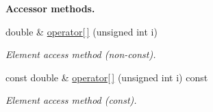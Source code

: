 \begin{Indent}{\bf Accessor methods.}\par
\begin{DoxyCompactItemize}
\item 
double \& \hyperlink{class_q_u_e_s_o_1_1_gsl_vector_a5fa9fb9a84749ea69919e6bc4a5ee9f9}{operator\mbox{[}$\,$\mbox{]}} (unsigned int i)
\begin{DoxyCompactList}\small\item\em Element access method (non-\/const). \end{DoxyCompactList}\item 
const double \& \hyperlink{class_q_u_e_s_o_1_1_gsl_vector_a10150c873dc75f642bda5d3dd09140f1}{operator\mbox{[}$\,$\mbox{]}} (unsigned int i) const 
\begin{DoxyCompactList}\small\item\em Element access method (const). \end{DoxyCompactList}\end{DoxyCompactItemize}
\end{Indent}
